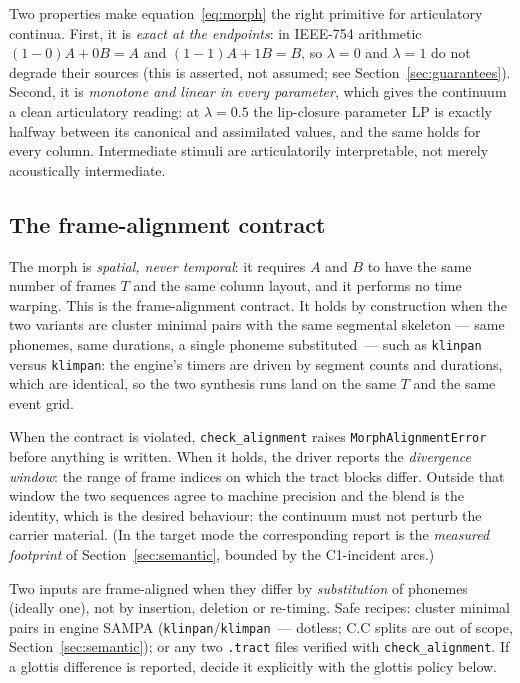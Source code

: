\documentclass[11pt,a4paper]{article}
\newcommand{\lam}{\lambda}
\newcommand{\code}[1]{\texttt{#1}}
\newcommand{\sectref}[1]{Section~\ref{#1}}
\begin{document}
Two properties make equation~\eqref{eq:morph} the right primitive
for articulatory continua.  First, it is \emph{exact at the
endpoints}: in IEEE-754 arithmetic $(1-0)A + 0B = A$ and
$(1-1)A + 1B = B$, so $\lam=0$ and $\lam=1$ do not degrade their
sources (this is asserted, not assumed; see
\sectref{sec:guarantees}).  Second, it is \emph{monotone and
linear in every parameter}, which gives the continuum a clean
articulatory reading: at $\lam = 0.5$ the lip-closure parameter LP
is exactly halfway between its canonical and assimilated values,
and the same holds for every column.  Intermediate stimuli are
articulatorily interpretable, not merely acoustically
intermediate.

\subsection{The frame-alignment contract}\label{sec:align}

The morph is \emph{spatial, never temporal}: it requires
$A$ and $B$ to have the same number of frames $T$ and the same
column layout, and it performs no time warping.  This is the
frame-alignment contract.  It holds by construction when the two
variants are cluster minimal pairs with the same segmental skeleton
--- same phonemes, same durations, a single phoneme substituted~---
such as \code{klinpan} versus \code{klimpan}: the engine's timers
are driven by segment counts and durations, which are identical, so
the two synthesis runs land on the same $T$ and the same event grid.

When the contract is violated, \code{check\_alignment} raises
\code{MorphAlignmentError} before anything is written.  When it
holds, the driver reports the \emph{divergence window}: the range of
frame indices on which the tract blocks differ.  Outside that window
the two sequences agree to machine precision and the blend is the
identity, which is the desired behaviour: the continuum must not
perturb the carrier material.  (In the target mode the corresponding
report is the \emph{measured footprint} of \sectref{sec:semantic},
bounded by the C1-incident arcs.)

\begin{keybox}
Two inputs are frame-aligned when they differ by
\emph{substitution} of phonemes (ideally one), not by insertion,
deletion or re-timing.  Safe recipes: cluster minimal pairs in
engine SAMPA (\code{klinpan}/\code{klimpan}~--- dotless; C.C splits
are out of scope, \sectref{sec:semantic}); or any two
\code{.tract} files verified with \code{check\_alignment}.  If a
glottis difference is reported, decide it explicitly with the
glottis policy below.
\end{keybox}
\end{document}
